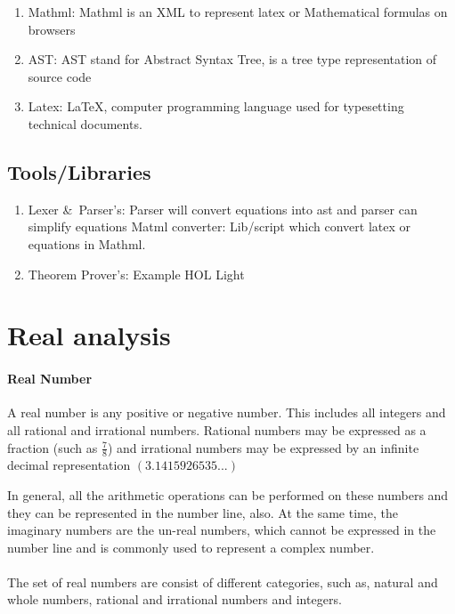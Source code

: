 \documentclass[15]{article}
\begin{document}
\begin{enumerate}
\item Mathml: Mathml is an XML to represent latex or Mathematical formulas  on browsers
\item AST: AST stand for Abstract Syntax Tree, is  a tree type representation of source code
\item Latex: LaTeX, computer programming language used for typesetting technical documents. 


\end{enumerate}



\subsection*{Tools/Libraries}

\begin{enumerate}
\item Lexer \&\ Parser's:  Parser will convert equations into ast and parser can simplify equations
Matml converter: Lib/script which convert latex or equations in Mathml.

\item Theorem Prover's: Example HOL Light

\end{enumerate}
\pagebreak

\section{Real analysis}

\paragraph{Real Number}
A real number is any positive or negative number. This includes all integers and all rational and irrational numbers. Rational numbers may be expressed as a fraction (such as $\frac{7}{8}$) and irrational numbers may be expressed by an infinite decimal representation $ (3.1415926535...)$

In general, all the arithmetic operations can be performed on these numbers and they can be represented in the number line, also. At the same time, the imaginary numbers are the un-real numbers, which cannot be expressed in the number line and is commonly used to represent a complex number. 
\\
\\
The set of real numbers are consist of different categories, such as, natural and whole numbers, rational and irrational numbers and integers.
\end{document}

